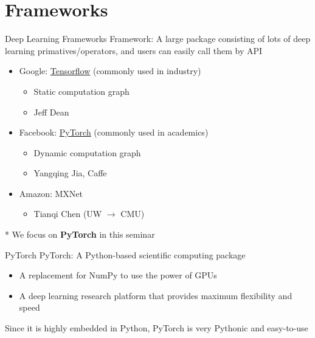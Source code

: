 \documentclass{../TexTemplate/myslide}
\begin{document}
\section{Frameworks}
\begin{frame}
\sectionpage
\end{frame}

\begin{frame}{Deep Learning Frameworks}
Framework: A large package consisting of lots of deep learning primatives/operators, and users can easily call them by API
\begin{itemize}
	\item Google: \href{https://www.tensorflow.org/}{Tensorflow} (commonly used in industry)
	\begin{itemize}
		\item Static computation graph
		\item Jeff Dean
	\end{itemize}
	\item Facebook: \href{https://pytorch.org/}{PyTorch} (commonly used in academics)
	\begin{itemize}
		\item Dynamic computation graph
		\item Yangqing Jia, Caffe
	\end{itemize}
	\item Amazon: MXNet
	\begin{itemize}
		\item Tianqi Chen (UW $\to$ CMU)
	\end{itemize}
\end{itemize}
* We focus on \textbf{PyTorch} in this seminar
\end{frame}

\begin{frame}{PyTorch}
PyTorch: A Python-based scientific computing package
\begin{itemize}
	\item A replacement for NumPy to use the power of GPUs
	\item A deep learning research platform that provides maximum flexibility and speed
\end{itemize}
Since it is highly embedded in Python, PyTorch is very Pythonic and easy-to-use
\end{frame}
\end{document}
